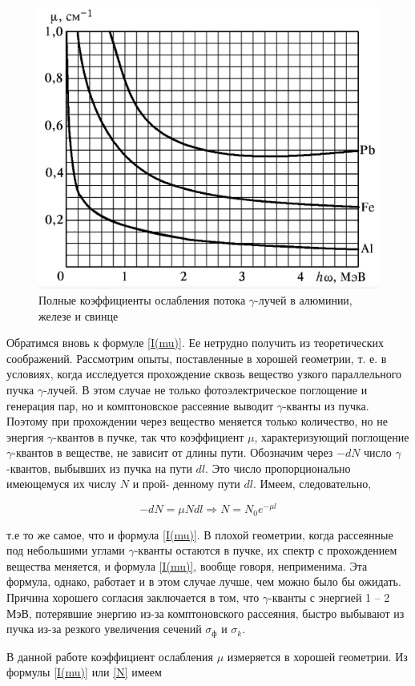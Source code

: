 \documentclass[a4paper,12pt]{article} %
\newcommand{\ga}{\ensuremath{\gamma}}
\begin{document}
	\begin{figure}[h!]
		\centering
		\includegraphics[width=0.6\linewidth]{mu}
		\caption{Полные коэффициенты ослабления потока \ga-лучей в алюминии, железе и свинце}
		\label{ris mu}
	\end{figure}
	
	
	Обратимся вновь к формуле \eqref{I(mu)}. Ее нетрудно получить из теоретических соображений. Рассмотрим опыты, поставленные в хорошей
	геометрии, т. е. в условиях, когда исследуется прохождение сквозь вещество узкого параллельного пучка \ga-лучей. В этом случае не только
	фотоэлектрическое поглощение и генерация пар, но и комптоновское
	рассеяние выводит \ga-кванты из пучка.
	Поэтому при прохождении через вещество меняется только количество, но не энергия \ga-квантов в пучке, так что коэффициент $ \mu $, характеризующий поглощение \ga-квантов в веществе, не зависит от длины
	пути. Обозначим через $ -dN $ число \ga-квантов, выбывших из пучка на
	пути $ dl $. Это число пропорционально имеющемуся их числу $ N $ и прой-
	денному пути $ dl $. Имеем, следовательно,
	
	\begin{equation}\label{N}
		-dN = \mu N dl \Rightarrow N = N_0 e^{-\mu l}
	\end{equation}
	
	т.е то же самое, что и формула \eqref{I(mu)}. В плохой геометрии, когда рассеянные под небольшими углами
	\ga-кванты остаются в пучке, их спектр с прохождением вещества меняется, и формула \eqref{I(mu)}, вообще говоря, неприменима. Эта формула, однако, работает и в этом случае лучше, чем можно было бы ожидать. Причина хорошего согласия заключается в том, что \ga-кванты с энергией 1 -- 2 МэВ, потерявшие энергию из-за комптоновского рассеяния,
	быстро выбывают из пучка из-за резкого увеличения сечений $ \sigma_{\text{ф}} $ и $ \sigma_k $.
	
	В данной работе коэффициент ослабления $ \mu $ измеряется в хорошей
	геометрии. Из формулы \eqref{I(mu)} или \eqref{N} имеем
	
\end{document}
